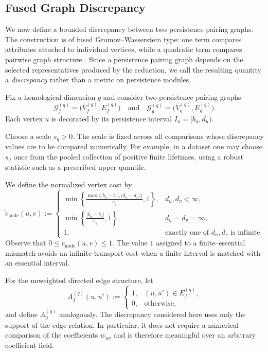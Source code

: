 \documentclass[11pt]{article}
\theoremstyle{paperdefinition}
\theoremstyle{paperplain}
\theoremstyle{paperremark}
\begin{document}
\subsection{Fused Graph Discrepancy}
\label{subsec:graph-discrepancies}

We now define a bounded discrepancy between two persistence pairing graphs. The construction is of fused Gromov--Wasserstein type: one term compares attributes attached to individual vertices, while a quadratic term compares pairwise graph structure \cite{vayer2020fused}. Since a persistence pairing graph depends on the selected representatives produced by the reduction, we call the resulting quantity a \emph{discrepancy} rather than a metric on persistence modules.

Fix a homological dimension $q$ and consider two persistence pairing
graphs
\[
\mathcal G_f^{(q)} = \bigl(V_f^{(q)},E_f^{(q)}\bigr) \quad\text{and}\quad \mathcal G_g^{(q)} = \bigl(V_g^{(q)},E_g^{(q)}\bigr).
\]
Each vertex $u$ is decorated by its persistence interval $I_u=[b_u,d_u)$.

Choose a scale $s_q>0$. The scale is fixed across all comparisons whose discrepancy values are to be compared numerically. For example, in a dataset one may choose $s_q$ once from the pooled collection of positive finite lifetimes, using a robust statistic such as a prescribed upper quantile.

We define the normalized vertex cost by
\begin{equation}
\label{eq:bounded-node-cost}
\widetilde c_{\mathrm{node}}(u,v) :=
\begin{cases}
\displaystyle
\min\left\{\frac{\max\{|b_u-b_v|,\lvert d_u-d_v\rvert\}}{s_q}, 1\right\}, & d_u,d_v<\infty, \\[4mm]
\displaystyle
\min\left\{\frac{|b_u-b_v|}{s_q}, 1\right\}, & d_u=d_v=\infty, \\[3mm]
1, & \text{exactly one of }d_u,d_v\text{ is infinite}. 
\end{cases}
\end{equation}
Observe that $0 \leq \widetilde c_{\mathrm{node}}(u,v) \leq 1$. The value $1$ assigned to a finite--essential mismatch avoids an infinite transport cost when a finite interval is matched with an essential interval.

For the unweighted directed edge structure, let
\[
A_f^{(q)}(u,u') :=
\begin{cases}
1, & (u,u')\in E_f^{(q)}, \\
0, & \text{otherwise},
\end{cases}
\]
and define $A_g^{(q)}$ analogously. The discrepancy considered here uses only the support of the edge relation. In particular, it does not require a numerical comparison of the coefficients $w_{uv}$ and is therefore meaningful over an arbitrary coefficient field.
\end{document}
